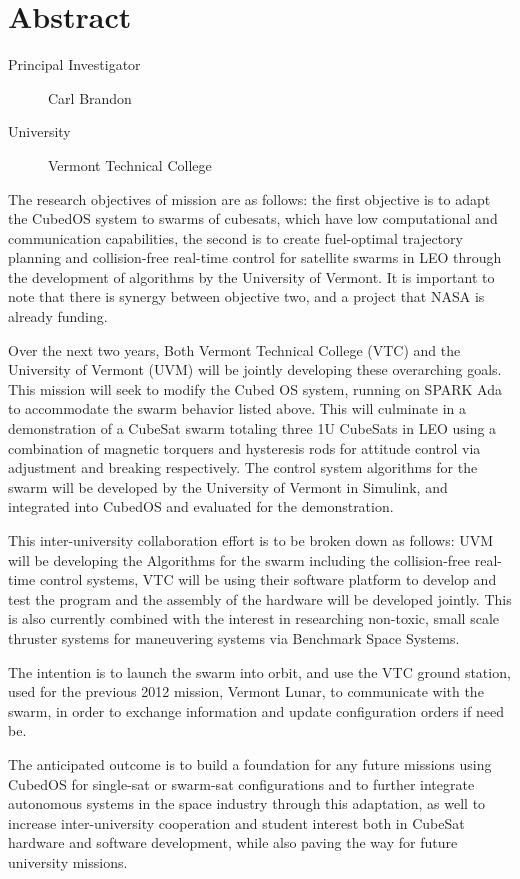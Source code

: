 \section{Abstract}

\begin{description}
\item[Principal Investigator] Carl Brandon
\item[University] Vermont Technical College
\end{description}

The research objectives of mission are as follows: the first objective
is to adapt the CubedOS system to swarms of cubesats, which have low
computational and communication capabilities, the second is to create
fuel-optimal trajectory planning and collision-free real-time control
for satellite swarms in LEO through the development of algorithms by
the University of Vermont. It is important to note that there is
synergy between objective two, and a project that NASA is already
funding\cite{ossareh:2019}.

Over the next two years, Both Vermont Technical College (VTC) and the
University of Vermont (UVM) will be jointly developing these
overarching goals. This mission will seek to modify the Cubed OS
system, running on SPARK Ada to accommodate the swarm behavior listed
above. This will culminate in a demonstration of a CubeSat swarm
totaling three 1U CubeSats in LEO using a combination of magnetic
torquers and hysteresis rods for attitude control via adjustment and
breaking respectively. The control system algorithms for the swarm
will be developed by the University of Vermont in Simulink, and
integrated into CubedOS and evaluated for the demonstration.

This inter-university collaboration effort is to be broken down as
follows: UVM will be developing the Algorithms for the swarm including
the collision-free real-time control systems, VTC will be using their
software platform to develop and test the program and the assembly of
the hardware will be developed jointly. This is also currently
combined with the interest in researching non-toxic, small scale
thruster systems for maneuvering systems via Benchmark Space Systems.

The intention is to launch the swarm into orbit, and use the VTC
ground station, used for the previous 2012 mission, Vermont Lunar, to
communicate with the swarm, in order to exchange information and
update configuration orders if need be.
	
The anticipated outcome is to build a foundation for any future
missions using CubedOS for single-sat or swarm-sat configurations and
to further integrate autonomous systems in the space industry through
this adaptation, as well to increase inter-university cooperation and
student interest both in CubeSat hardware and software development,
while also paving the way for future university missions.
	
